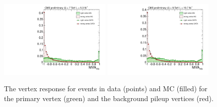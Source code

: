 \begin{figure}
  \includegraphics[width=0.48\textwidth]{ch3_comm_anal_comps/plots/vertex_bdt_output_7TeV.pdf}
  \includegraphics[width=0.48\textwidth]{ch3_comm_anal_comps/plots/vertex_bdt_output_8TeV.pdf}
  \caption{The vertex \BDT response for \Zmumu events in data (points) and MC (filled) for the primary vertex (green) and the background pileup vertices (red).}
  \label{fig:vertex_bdt_response}
\end{figure}

